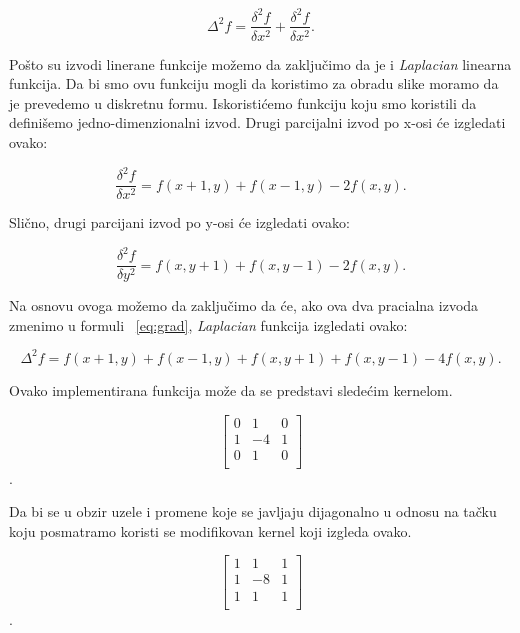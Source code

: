 \documentclass[a4paper,12pt,titlepage]{article}
\begin{document}
\begin{equation}\label{eq:grad}
\Delta^{2}f = \dfrac{\delta^{2}f}{\delta x^{2}} + \dfrac{\delta^{2}f}{\delta x^{2}}. 
\end{equation}

Pošto su izvodi linerane funkcije možemo da zaključimo da je i \emph{Laplacian} linearna funkcija. Da bi smo ovu funkciju mogli da koristimo za obradu slike moramo da je prevedemo u diskretnu formu. Iskoristićemo funkciju koju smo koristili da definišemo jedno-dimenzionalni izvod. Drugi parcijalni izvod po x-osi će izgledati ovako:

\begin{equation}\label{eq:grad2}
\dfrac{\delta^{2}f}{\delta x^{2}} = f(x + 1, y) + f(x - 1, y) - 2f(x, y).
\end{equation}

Slično, drugi parcijani izvod po y-osi će izgledati ovako:

\begin{equation}\label{eq:grad3}
\dfrac{\delta^{2}f}{\delta y^{2}} = f(x, y + 1) + f(x, y - 1) - 2f(x, y).
\end{equation}

Na osnovu ovoga možemo da zaključimo da će, ako ova dva pracialna izvoda zmenimo u formuli ~\ref{eq:grad}, \emph{Laplacian} funkcija izgledati ovako:

\begin{equation}\label{eq:grad4}
\Delta^{2}f = f(x + 1, y) + f(x - 1, y) + f(x, y + 1) + f(x, y - 1) - 4f(x, y). 
\end{equation}

Ovako implementirana funkcija može da se predstavi sledećim kernelom.

\[
\begin{bmatrix}
     0 & 1 & 0 \\
     1 & -4 & 1 \\
     0 & 1 & 0 \\
\end{bmatrix}
\]. 

Da bi se u obzir uzele i promene koje se javljaju dijagonalno u odnosu na tačku koju posmatramo koristi se modifikovan kernel koji izgleda ovako.

\[
\begin{bmatrix}
     1 & 1 & 1 \\
     1 & -8 & 1 \\
     1 & 1 & 1 \\
\end{bmatrix}
\].
\end{document}
